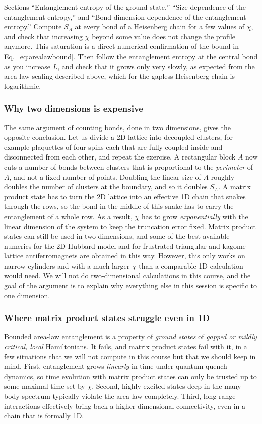 \documentclass[lecture_notes.tex]{subfiles}
\begin{document}
\begin{notebook}
Sections ``Entanglement entropy of the ground state,'' ``Size dependence of the entanglement
entropy,'' and ``Bond dimension dependence of the entanglement entropy.'' Compute $S_A$ at every
bond of a Heisenberg chain for a few values of $\chi$, and check that increasing $\chi$ beyond
some value does not change the profile anymore. This saturation is a direct numerical confirmation
of the bound in Eq.~\eqref{eq:arealawbound}. Then follow the entanglement entropy at the central
bond as you increase $L$, and check that it grows only very slowly, as expected from the area-law
scaling described above, which for the gapless Heisenberg chain is logarithmic.
\end{notebook}

\subsubsection{Why two dimensions is expensive}
The same argument of counting bonds, done in two
dimensions, gives the opposite conclusion. Let us divide a 2D lattice into decoupled clusters, for
example plaquettes of four spins each that are fully coupled inside and disconnected from each
other, and repeat the exercise. A rectangular block $A$ now cuts a number of bonds between
clusters that is proportional to the \emph{perimeter} of $A$, and not a fixed number of points.
Doubling the linear size of $A$ roughly doubles the number of clusters at the boundary, and so it
doubles $S_A$. A matrix product state has to turn the 2D lattice into an effective 1D chain that
snakes through the rows, so the bond in the middle of this snake has to carry the entanglement of
a whole row. As a result, $\chi$ has to grow \emph{exponentially} with the linear dimension of the
system to keep the truncation error fixed. Matrix product states can still be used in two
dimensions, and some of the best available numerics for the 2D Hubbard model and for frustrated
triangular and kagome-lattice antiferromagnets are obtained in this way. However, this only works
on narrow cylinders and with a much larger $\chi$ than a comparable 1D calculation would need. We
will not do two-dimensional calculations in this course, and the goal of the argument is to
explain why everything else in this session is specific to one dimension.

\subsubsection{Where matrix product states struggle even in 1D}
Bounded area-law entanglement is a
property of \emph{ground states} of \emph{gapped or mildly critical, local} Hamiltonians. It
fails, and matrix product states fail with it, in a few situations that we will not compute in
this course but that we should keep in mind. First, entanglement grows \emph{linearly} in time
under quantum quench dynamics, so time evolution with matrix product states can only be trusted up
to some maximal time set by $\chi$. Second, highly excited states deep in the many-body spectrum
typically violate the area law completely. Third, long-range interactions effectively bring back a
higher-dimensional connectivity, even in a chain that is formally 1D.
\end{document}

